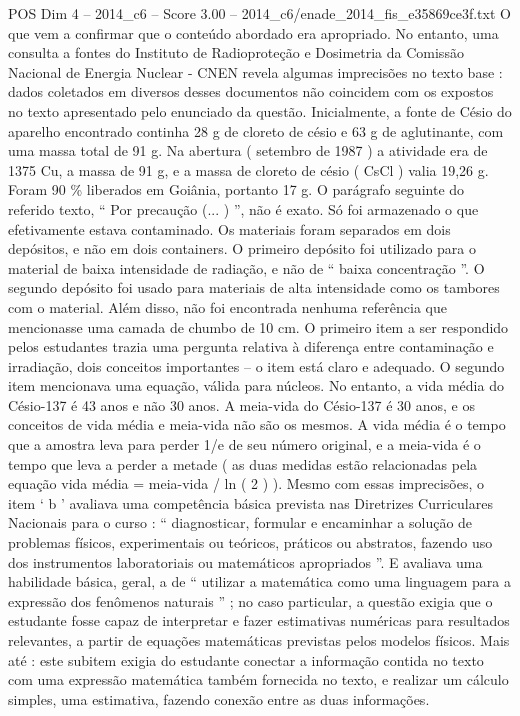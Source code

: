 \begin{textsample}{POS Dim 4 – 2014\_c6 – Score 3.00 – 2014\_c6/enade\_2014\_fis\_e35869ce3f.txt}
O que vem a confirmar que o conteúdo abordado era apropriado.
No entanto, uma consulta a fontes do Instituto de Radioproteção e Dosimetria da Comissão Nacional de Energia Nuclear - CNEN revela algumas imprecisões no texto base : dados coletados em diversos desses documentos não coincidem com os expostos no texto apresentado pelo enunciado da questão.
Inicialmente, a fonte de Césio do aparelho encontrado continha 28 g de cloreto de césio e 63 g de aglutinante, com uma massa total de 91 g.
Na abertura ( setembro de 1987 ) a atividade era de 1375 Cu, a massa de 91 g, e a massa de cloreto de césio ( CsCl ) valia 19,26 g.
Foram 90 \% liberados em Goiânia, portanto 17 g.
O parágrafo seguinte do referido texto, “ Por precaução (... ) ”, não é exato.
Só foi armazenado o que efetivamente estava contaminado.
Os materiais foram separados em dois depósitos, e não em dois containers.
O primeiro depósito foi utilizado para o material de baixa intensidade de radiação, e não de “ baixa concentração ”.
O segundo depósito foi usado para materiais de alta intensidade como os tambores com o material.
Além disso, não foi encontrada nenhuma referência que mencionasse uma camada de chumbo de 10 cm.
O primeiro item a ser respondido pelos estudantes trazia uma pergunta relativa à diferença entre contaminação e irradiação, dois conceitos importantes – o item está claro e adequado.
O segundo item mencionava uma equação, válida para núcleos.
No entanto, a vida média do Césio-137 é 43 anos e não 30 anos.
A meia-vida do Césio-137 é 30 anos, e os conceitos de vida média e meia-vida não são os mesmos.
A vida média é o tempo que a amostra leva para perder 1/e de seu número original, e a meia-vida é o tempo que leva a perder a metade ( as duas medidas estão relacionadas pela equação vida média = meia-vida / ln ( 2 ) ).
Mesmo com essas imprecisões, o item ‘ b ’ avaliava uma competência básica prevista nas Diretrizes Curriculares Nacionais para o curso : “ diagnosticar, formular e encaminhar a solução de problemas físicos, experimentais ou teóricos, práticos ou abstratos, fazendo uso dos instrumentos laboratoriais ou matemáticos apropriados ”.
E avaliava uma habilidade básica, geral, a de “ utilizar a matemática como uma linguagem para a expressão dos fenômenos naturais ” ; no caso particular, a questão exigia que o estudante fosse capaz de interpretar e fazer estimativas numéricas para resultados relevantes, a partir de equações matemáticas previstas pelos modelos físicos.
Mais até : este subitem exigia do estudante conectar a informação contida no texto com uma expressão matemática também fornecida no texto, e realizar um cálculo simples, uma estimativa, fazendo conexão entre as duas informações.

\end{textsample}
